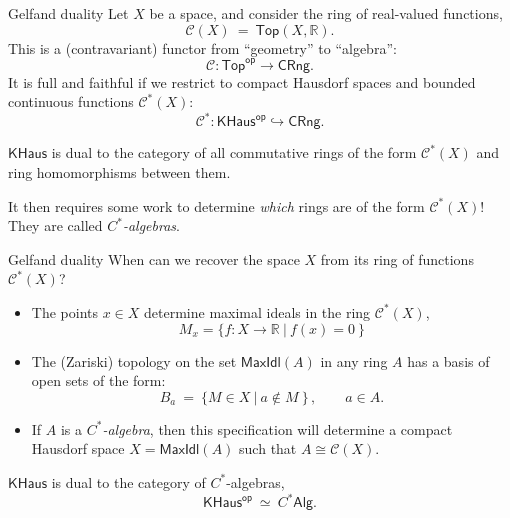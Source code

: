 \documentclass{beamer}
\begin{document}
\begin{frame}{Gelfand duality}
Let $X$ be a  space, and consider the ring of real-valued functions,
\[
 \mathcal{C}(X)\ =\ \mathsf{Top}(X, \mathbb{R}).
 \]
 This  is a (contravariant) functor from ``geometry'' to ``algebra'':
 \[
 \mathcal{C} : \mathsf{Top}^\mathsf{op} \to \mathsf{CRng}.
 \]
%
It is full and faithful if we restrict to compact Hausdorf spaces and bounded continuous functions  $\mathcal{C}^*(X)$:
  \[
 \mathcal{C}^* : \mathsf{KHaus}^\mathsf{op} \hookrightarrow \mathsf{CRng}.
 \]
 \begin{theorem}
 $\mathsf{KHaus}$ is dual to the category of all commutative rings of the form  $\mathcal{C}^*(X)$ and ring homomorphisms between them.
 \end{theorem}
 \medskip
 
 It then requires some work to  determine \emph{which} rings are of the form $\mathcal{C}^*(X)$!  
 They are called \emph{$C^*$-algebras}.

\end{frame}
\begin{frame}{Gelfand duality}
When can we recover the space $X$ from its ring of functions $\mathcal{C}^*(X)$?

\begin{itemize}
\item The points  $x\in X$ determine maximal ideals in the ring $\mathcal{C}^*(X)$,
\[
M_x = \{ f : X\to \mathbb{R}\ |\ f(x) = 0\ \}
\]
\item The (Zariski) topology on the set $\mathsf{MaxIdl}(A)$ in any ring $A$ has a basis of open sets of the form:
\[
B_a\ =\ \{M \in X\ |\ a\notin M\ \}\, ,\qquad a\in A.
\]
\item If $A$ is a \emph{$C^*$-algebra}, then this specification will determine a compact Hausdorf space $X = \mathsf{MaxIdl}(A)$ such that $A\cong \mathcal{C}(X)$.
\end{itemize}

 \begin{theorem}
 $\mathsf{KHaus}$ is dual to the category of $C^*$-algebras,
 \[
\mathsf{KHaus}^\mathsf{op}\ \simeq\ C^*\mathsf{Alg}.
 \]
 \end{theorem}

\end{frame}
\end{document}
